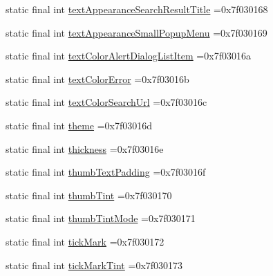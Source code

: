 \begin{DoxyCompactItemize}
\item 
static final int \mbox{\hyperlink{classbr_1_1unb_1_1cic_1_1mp_1_1marketmaster_1_1test_1_1R_1_1attr_a94def7ed187979d0ba7c11c3ae2048e2}{text\+Appearance\+Search\+Result\+Title}} =0x7f030168
\item 
static final int \mbox{\hyperlink{classbr_1_1unb_1_1cic_1_1mp_1_1marketmaster_1_1test_1_1R_1_1attr_a353ade76a5de98d2b3937f2940108eed}{text\+Appearance\+Small\+Popup\+Menu}} =0x7f030169
\item 
static final int \mbox{\hyperlink{classbr_1_1unb_1_1cic_1_1mp_1_1marketmaster_1_1test_1_1R_1_1attr_a0d25ea6b1c50c8a7bcb5899bb3156e09}{text\+Color\+Alert\+Dialog\+List\+Item}} =0x7f03016a
\item 
static final int \mbox{\hyperlink{classbr_1_1unb_1_1cic_1_1mp_1_1marketmaster_1_1test_1_1R_1_1attr_ab67cda9a84686b9cf58f7438e01cbf11}{text\+Color\+Error}} =0x7f03016b
\item 
static final int \mbox{\hyperlink{classbr_1_1unb_1_1cic_1_1mp_1_1marketmaster_1_1test_1_1R_1_1attr_a38273d9795dc8d00b869eac198d9a185}{text\+Color\+Search\+Url}} =0x7f03016c
\item 
static final int \mbox{\hyperlink{classbr_1_1unb_1_1cic_1_1mp_1_1marketmaster_1_1test_1_1R_1_1attr_a1bafce659a5472bb29bc469ea313730a}{theme}} =0x7f03016d
\item 
static final int \mbox{\hyperlink{classbr_1_1unb_1_1cic_1_1mp_1_1marketmaster_1_1test_1_1R_1_1attr_aff173f44487d273dbe0cdfb84d6826ec}{thickness}} =0x7f03016e
\item 
static final int \mbox{\hyperlink{classbr_1_1unb_1_1cic_1_1mp_1_1marketmaster_1_1test_1_1R_1_1attr_a5efc5bf719f481f135cfdd92c89676d3}{thumb\+Text\+Padding}} =0x7f03016f
\item 
static final int \mbox{\hyperlink{classbr_1_1unb_1_1cic_1_1mp_1_1marketmaster_1_1test_1_1R_1_1attr_a4d5f8734bb460822149c06925ef47433}{thumb\+Tint}} =0x7f030170
\item 
static final int \mbox{\hyperlink{classbr_1_1unb_1_1cic_1_1mp_1_1marketmaster_1_1test_1_1R_1_1attr_a915085202d245ae236b234e6a9ac93db}{thumb\+Tint\+Mode}} =0x7f030171
\item 
static final int \mbox{\hyperlink{classbr_1_1unb_1_1cic_1_1mp_1_1marketmaster_1_1test_1_1R_1_1attr_aa58917da003e18d0e83f604a8b9236a9}{tick\+Mark}} =0x7f030172
\item 
static final int \mbox{\hyperlink{classbr_1_1unb_1_1cic_1_1mp_1_1marketmaster_1_1test_1_1R_1_1attr_aeb7bc2bb1f56104a30ed8e4b1229c1f8}{tick\+Mark\+Tint}} =0x7f030173
\item 

\end{DoxyCompactItemize}
